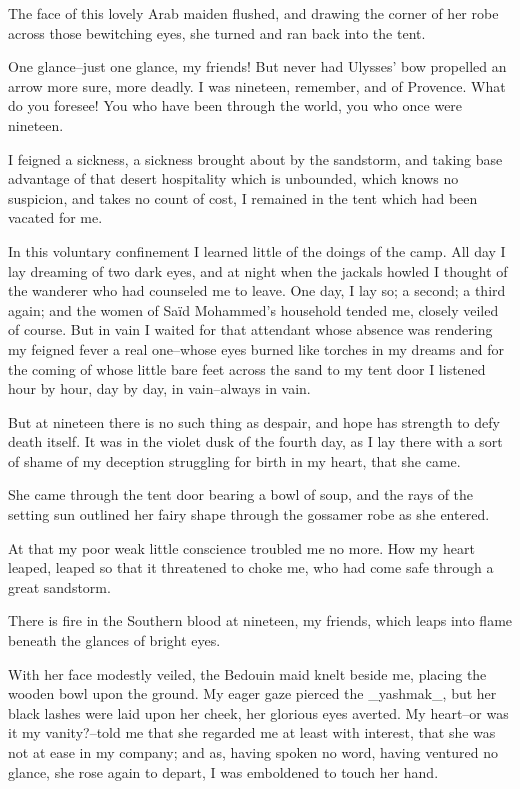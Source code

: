 The face of this lovely Arab maiden flushed, and drawing the corner of
her robe across those bewitching eyes, she turned and ran back into
the tent.

One glance--just one glance, my friends! But never had Ulysses' bow
propelled an arrow more sure, more deadly. I was nineteen, remember,
and of Provence. What do you foresee! You who have been through the
world, you who once were nineteen.

I feigned a sickness, a sickness brought about by the sandstorm, and
taking base advantage of that desert hospitality which is unbounded,
which knows no suspicion, and takes no count of cost, I remained in
the tent which had been vacated for me.

In this voluntary confinement I learned little of the doings of the
camp. All day I lay dreaming of two dark eyes, and at night when the
jackals howled I thought of the wanderer who had counseled me to
leave. One day, I lay so; a second; a third again; and the women of
Saïd Mohammed's household tended me, closely veiled of course. But in
vain I waited for that attendant whose absence was rendering my
feigned fever a real one--whose eyes burned like torches in my dreams
and for the coming of whose little bare feet across the sand to my
tent door I listened hour by hour, day by day, in vain--always in
vain.

But at nineteen there is no such thing as despair, and hope has
strength to defy death itself. It was in the violet dusk of the fourth
day, as I lay there with a sort of shame of my deception struggling
for birth in my heart, that she came.

She came through the tent door bearing a bowl of soup, and the rays of
the setting sun outlined her fairy shape through the gossamer robe as
she entered.

At that my poor weak little conscience troubled me no more. How my
heart leaped, leaped so that it threatened to choke me, who had come
safe through a great sandstorm.

There is fire in the Southern blood at nineteen, my friends, which
leaps into flame beneath the glances of bright eyes.

With her face modestly veiled, the Bedouin maid knelt beside me,
placing the wooden bowl upon the ground. My eager gaze pierced the
_yashmak_, but her black lashes were laid upon her cheek, her glorious
eyes averted. My heart--or was it my vanity?--told me that she
regarded me at least with interest, that she was not at ease in my
company; and as, having spoken no word, having ventured no glance,
she rose again to depart, I was emboldened to touch her hand.

